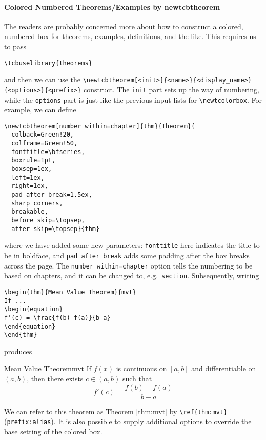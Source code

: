 \paragraph{Colored Numbered Theorems/Examples by newtcbtheorem}
The readers are probably concerned more about how to construct a colored, numbered box for theorems, examples, definitions, and the like. This requires us to pass
\begin{lstlisting}
\tcbuselibrary{theorems}
\end{lstlisting}
and then we can use the \texttt{\textbackslash newtcbtheorem[<init>]\{<name>\}\{<display\_\allowbreak name>\}\{<options>\}\{<prefix>\}} construct. The \texttt{init} part sets up the way of numbering, while the \texttt{options} part is just like the previous input lists for \texttt{\textbackslash newtcolorbox}. For example, we can define
\begin{lstlisting}
\newtcbtheorem[number within=chapter]{thm}{Theorem}{
  colback=Green!20,
  colframe=Green!50,
  fonttitle=\bfseries,
  boxrule=1pt,
  boxsep=1ex,
  left=1ex,
  right=1ex,
  pad after break=1.5ex,
  sharp corners,
  breakable,
  before skip=\topsep,
  after skip=\topsep}{thm}
\end{lstlisting}
where we have added some new parameters: \texttt{fonttitle} here indicates the title to be in boldface, and \texttt{pad after break} adds some padding after the box breaks across the page. The \texttt{number within=chapter} option tells the numbering to be based on chapters, and it can be changed to, e.g.\ \texttt{section}. Subsequently, writing
\begin{lstlisting}
\begin{thm}{Mean Value Theorem}{mvt}
If ...
\begin{equation}
f'(c) = \frac{f(b)-f(a)}{b-a}
\end{equation}
\end{thm}
\end{lstlisting}
produces
\begin{thm}{Mean Value Theorem}{mvt}
If $f(x)$ is continuous on $[a,b]$ and differentiable on $(a,b)$, then there exists $c \in (a,b)$ such that
\begin{equation}
f'(c) = \frac{f(b)-f(a)}{b-a}
\end{equation}
\end{thm}
We can refer to this theorem as Theorem \ref{thm:mvt} by \texttt{\textbackslash ref\{thm:mvt\}} (\texttt{prefix:alias}). It is also possible to supply additional options to override the base setting of the colored box.

